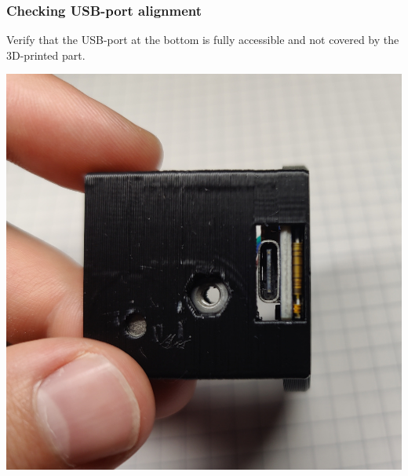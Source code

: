 \documentclass[]{article}
\begin{document}
\subsubsection{Checking USB-port alignment}
\begin{minipage}[t]{0.5\linewidth}
	\vspace{0pt}
	Verify that the USB-port at the bottom is fully accessible and not covered by the 3D-printed part.
\end{minipage}
\hfill
\begin{minipage}[t]{0.4\linewidth}
	\vspace{0pt}
	\includegraphics[width=\linewidth]{images/01_displayunit/15_check_usb.jpg}
\end{minipage}
\end{document}
